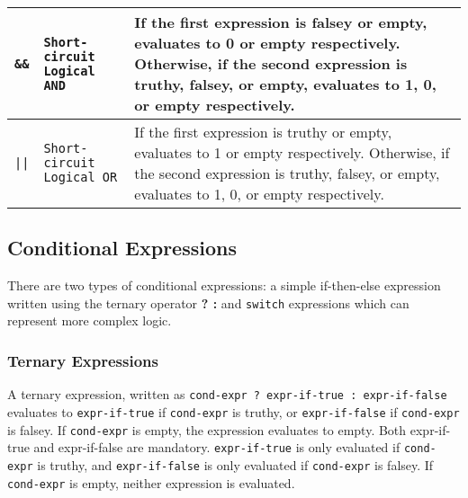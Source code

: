 \begin{table}[H]
\begin{tabular}{ |p{2cm}|p{5cm}|p{7cm}|  }
			\rule{0pt}{3ex}\texttt{\&\&} & \texttt{Short-circuit Logical AND} & {If the first expression is falsey or empty, evaluates to 0 or empty respectively. Otherwise, if the second expression is truthy, falsey, or empty, evaluates to 1, 0, or empty respectively.} \\ \hline
			\rule{0pt}{3ex}\texttt{||} & \texttt{Short-circuit Logical OR} & {If the first expression is truthy or empty, evaluates to 1 or empty respectively. Otherwise, if the second expression is truthy, falsey, or empty, evaluates to 1, 0, or empty respectively.} \\ \hline
			\end{tabular}
			\end{table}

\subsection{Conditional Expressions}
			There are two types of conditional expressions: a simple if-then-else expression written using the ternary operator \textbf{? :} and \texttt{switch} expressions which can represent more complex logic.

\subsubsection{Ternary Expressions}
\label{sec:Ternary}
A ternary expression, written as \texttt{cond-expr ? expr-if-true : expr-if-false} evaluates to \texttt{expr-if-true} if \texttt{cond-expr} is truthy, or \texttt{expr-if-false} if \texttt{cond-expr} is falsey. If \texttt{cond-expr} is empty, the expression evaluates to empty. Both expr-if-true and expr-if-false are mandatory. \texttt{expr-if-true} is only evaluated if \texttt{cond-expr} is truthy, and \texttt{expr-if-false} is only evaluated if \texttt{cond-expr} is falsey. If \texttt{cond-expr} is empty, neither expression is evaluated.


